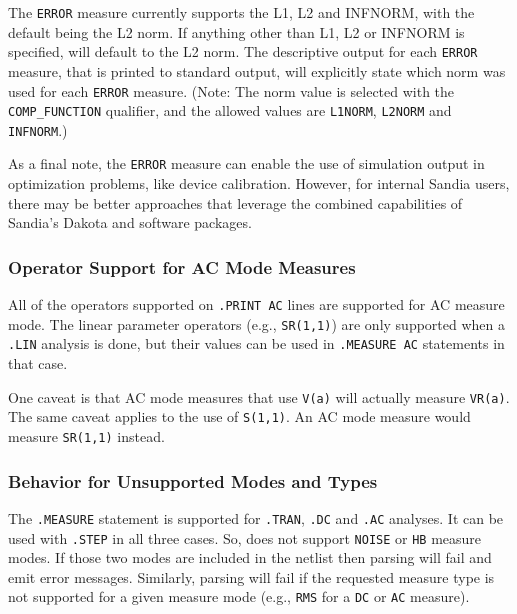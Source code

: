 \begin{XyceItemize}
  \item The {\tt ERROR} measure currently supports the L1, L2 and
    INFNORM, with the default being the L2 norm.  If anything other
    than L1, L2 or INFNORM is specified, \Xyce{} will default to the
    L2 norm.  The descriptive output for each {\tt ERROR} measure,
    that is printed to standard output, will explicitly state which
    norm was used for each {\tt ERROR} measure.  (Note: The norm value
    is selected with the {\tt COMP\_FUNCTION} qualifier, and the
    allowed values are {\tt L1NORM}, {\tt L2NORM} and {\tt INFNORM}.)

\end{XyceItemize}

As a final note, the \texttt{ERROR} measure can enable the use
of \Xyce{} simulation output in optimization problems, like device
calibration.  However, for internal Sandia users, there may be better
approaches that leverage the combined capabilities of Sandia's Dakota
and \Xyce{} software packages.

\subsubsection{Operator Support for AC Mode Measures}
\label{Measure_AC_Op_Support}
All of the operators supported on \texttt{.PRINT AC} lines are supported
for AC measure mode.  The linear parameter operators (e.g., \texttt{SR(1,1)})
are only supported when a \texttt{.LIN} analysis is done, but their values
can be used in \texttt{.MEASURE AC} statements in that case.

One caveat is that AC mode measures that use \texttt{V(a)} will actually
measure \texttt{VR(a)}. The same caveat applies to the use of \texttt{S(1,1)}.
An AC mode measure would measure \texttt{SR(1,1)} instead.

\subsubsection{Behavior for Unsupported Modes and Types}
\label{Measure_Unsupported_Types}
The \texttt{.MEASURE} statement is supported
for \texttt{.TRAN}, \texttt{.DC} and
\texttt{.AC} analyses. It can be used with {\tt .STEP} in all three cases.
So, \Xyce{} does not support \texttt{NOISE} or \texttt{HB} measure
modes.  If those two modes are included in the netlist then \Xyce{}
parsing will fail and emit error messages.  Similarly, \Xyce{} parsing
will fail if the requested measure type is not supported for a given
measure mode (e.g., \texttt{RMS} for a
\texttt{DC} or \texttt{AC} measure).


